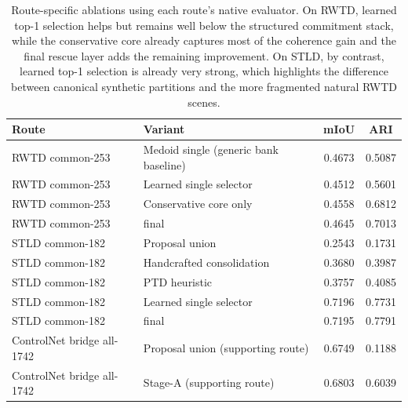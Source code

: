 \begin{table}[t]
\centering
\scriptsize
\setlength{\tabcolsep}{5pt}
\renewcommand{\arraystretch}{0.98}
\begin{tabularx}{\textwidth}{@{}p{}Xcc@{}}
\toprule
Route & Variant & mIoU & ARI \\
\midrule
RWTD common-253 & Medoid single (generic bank baseline) & 0.4673 & 0.5087 \\
RWTD common-253 & Learned single selector & 0.4512 & 0.5601 \\
RWTD common-253 & Conservative core only & 0.4558 & 0.6812 \\
RWTD common-253 & \sys{} final & 0.4645 & 0.7013 \\
\midrule
STLD common-182 & Proposal union & 0.2543 & 0.1731 \\
STLD common-182 & Handcrafted consolidation & 0.3680 & 0.3987 \\
STLD common-182 & PTD heuristic & 0.3757 & 0.4085 \\
STLD common-182 & Learned single selector & 0.7196 & 0.7731 \\
STLD common-182 & \sys{} final & 0.7195 & 0.7791 \\
\midrule
ControlNet bridge all-1742 & Proposal union (supporting route) & 0.6749 & 0.1188 \\
ControlNet bridge all-1742 & \sys{} Stage-A (supporting route) & 0.6803 & 0.6039 \\
\bottomrule
\end{tabularx}
\caption{Route-specific ablations using each route's native evaluator. On RWTD, learned top-1 selection helps but remains well below the structured commitment stack, while the conservative core already captures most of the coherence gain and the final rescue layer adds the remaining improvement. On STLD, by contrast, learned top-1 selection is already very strong, which highlights the difference between canonical synthetic partitions and the more fragmented natural RWTD scenes.}
\label{tab:proposal_ablation}
\end{table}
